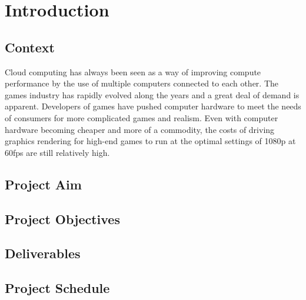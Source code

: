 \chapter{Introduction}
\label{chapter1}

\section{Context}
Cloud computing has always been seen as a way of improving compute performance by the
use of multiple computers connected to each other. The games industry has rapidly evolved
along the years and a great deal of demand is apparent. Developers of games have pushed
computer hardware to meet the needs of consumers for more complicated games and
realism. Even with computer hardware becoming cheaper and more of a commodity, the
costs of driving graphics rendering for high-end games to run at the optimal settings of
1080p at 60fps are still relatively high.

\section{Project Aim}
\lipsum[1-1] \cite{parikh1980adaptive}

\section{Project Objectives}
\lipsum[1-1]

\section{Deliverables}
\lipsum[1-1]

\section{Project Schedule}
\lipsum[1-1]